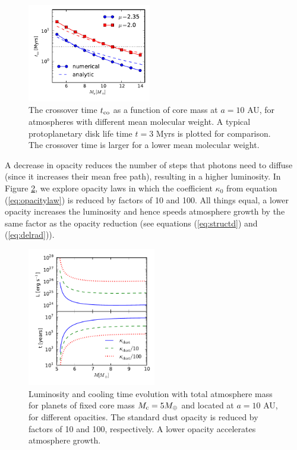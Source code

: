 \documentclass[apj]{emulateapj}
\begin{document}
\begin{figure}[h]
\centering
\includegraphics[width=0.48\textwidth]{../../figs/ModelAtmospheres/RadSelfGravPoly/PaperFigs/coolingtime_vs_Mc_10au.pdf}
\caption{The crossover time $t_{\rm{co}}$ as a function of core mass at $a=10$ AU, for atmospheres with different mean molecular weight. A typical protoplanetary disk life time $t=3$ Myrs is plotted for comparison. The crossover time is larger for a lower mean molecular weight.}
\label{fig:tvsMcomp}
\end{figure}

A decrease in opacity reduces the number of steps that photons need to diffuse (since it increases their mean free path), resulting in a higher luminosity. In Figure \ref{fig:LtvsMopacity}, we explore opacity laws in which the coefficient $\kappa_0$ from equation (\ref{eq:opacitylaw}) is reduced by factors of 10 and 100. All things equal, a lower opacity increases the luminosity and hence speeds atmosphere growth by the same factor as the opacity reduction (see equations (\ref{eq:structd}) and (\ref{eq:delrad})). 
 

 \begin{figure}[h]
\centering
\includegraphics[width=0.5\textwidth]{../../figs/ModelAtmospheres/RadSelfGravPoly/PaperFigs/opacity_effect.pdf}
\caption{Luminosity and cooling time evolution with total atmosphere mass for planets of fixed core mass $M_{\rm c}=5 M_{\oplus}$ and located at $a=10$ AU, for different opacities. The standard dust opacity is reduced by factors of 10 and 100, respectively. A lower opacity accelerates atmosphere growth.}
\label{fig:LtvsMopacity}
\end{figure}
\end{document}
